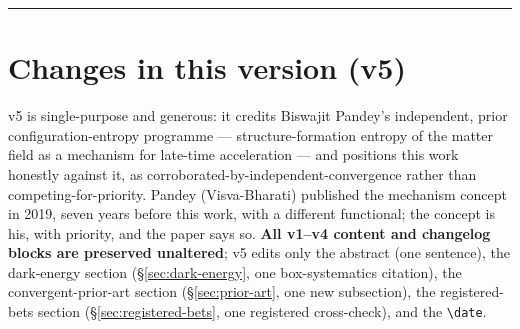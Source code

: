 \documentclass[11pt,a4paper]{article}
\begin{document}
\vspace{0.5em}
\hrule
\vspace{0.5em}

\section*{Changes in this version (v5)}

v5 is single-purpose and generous: it credits Biswajit Pandey's independent, prior configuration-entropy programme --- structure-formation entropy of the matter field as a mechanism for late-time acceleration --- and positions this work honestly against it, as corroborated-by-independent-convergence rather than competing-for-priority. Pandey (Visva-Bharati) published the mechanism concept in 2019, seven years before this work, with a different functional; the concept is his, with priority, and the paper says so. \textbf{All v1--v4 content and changelog blocks are preserved unaltered}; v5 edits only the abstract (one sentence), the dark-energy section (\S\ref{sec:dark-energy}, one box-systematics citation), the convergent-prior-art section (\S\ref{sec:prior-art}, one new subsection), the registered-bets section (\S\ref{sec:registered-bets}, one registered cross-check), and the \texttt{\textbackslash date}.
\end{document}
